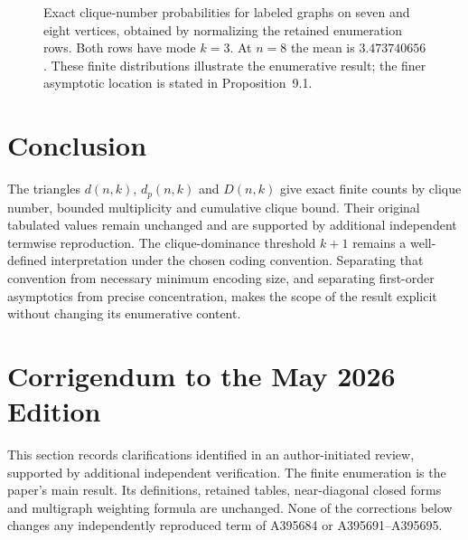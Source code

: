 \documentclass[11pt,a4paper]{article}
\theoremstyle{definition}
\begin{document}
\begin{figure}[htbp]\centering
{}
\caption{Exact clique-number probabilities for labeled graphs on
seven and eight vertices, obtained by normalizing the retained
enumeration rows. Both rows have mode $k=3$. At $n=8$ the mean is
$3.473740656$. These finite distributions illustrate the enumerative
result; the finer asymptotic location is stated in Proposition~9.1.}
\end{figure}

\section{Conclusion}
The triangles $d(n,k)$, $d_p(n,k)$ and $D(n,k)$ give exact finite
counts by clique number, bounded multiplicity and cumulative clique
bound. Their original tabulated values remain unchanged and are
supported by additional independent termwise reproduction.
The clique-dominance threshold $k+1$ remains a well-defined
interpretation under the chosen coding convention. Separating that
convention from necessary minimum encoding size, and separating
first-order asymptotics from precise concentration, makes the scope
of the result explicit without changing its enumerative content.

\section{Corrigendum to the May 2026 Edition}\label{sec:corrigendum}
This section records clarifications identified in an author-initiated
review, supported by additional independent verification. The
finite enumeration is the paper's main result. Its definitions,
retained tables, near-diagonal closed forms and multigraph weighting
formula are unchanged. None of the corrections below changes any
independently reproduced term of A395684 or A395691--A395695.
\end{document}
